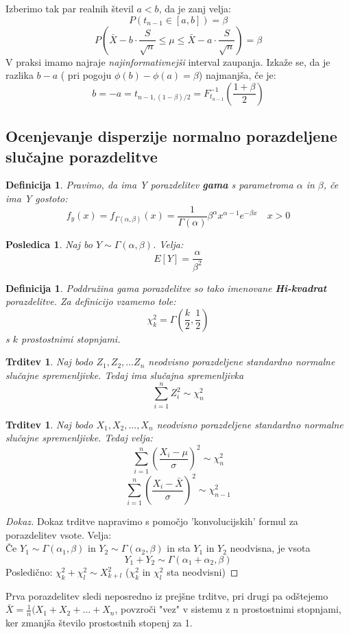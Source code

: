 \documentclass[11pt]{article}
\newtheorem{Trditev}[Izrek]{{\sc Trditev}}
\newtheorem{Posledica}[Izrek]{{\sc Posledica}}
\newtheorem{Definicija}[Izrek]{{\sc Definicija}}
\newenvironment{dokaz}[1][{\sc Dokaz}]{\begin{proof}[#1]\renewcommand*{\qedsymbol}{\(\blacksquare\)}}{\end{proof}}
\begin{document}
Izberimo tak par realnih števil $a<b$, da je zanj velja:
$$P(t_{n-1}\in [a,b]) = \beta$$
$$P(\bar{X}-b \cdot \frac{S}{\sqrt{n}} \le \mu \le \bar{X} -a \cdot \frac{S}{\sqrt{n}}) = \beta$$
V praksi imamo najraje \textit{najinformativnejši} interval zaupanja. Izkaže se, da je razlika $b-a$ ( pri pogoju $\phi(b) - \phi(a) = \beta$) najmanjša, če je:
$$b = -a = t_{n-1,(1-\beta)/2} = F^{-1}_{t_{n-1}}\left(\frac{1+\beta}{2}\right)$$
\subsection{Ocenjevanje disperzije normalno porazdeljene slučajne porazdelitve}

\begin{Definicija}
	Pravimo, da ima Y porazdelitev \textbf{gama} s parametroma $\alpha$ in $\beta$, če ima Y gostoto:
	$$f_y(x) = f_{\Gamma(\alpha,\beta)} (x) = \frac{1}{\Gamma(\alpha)}\beta^{\alpha}x^{\alpha - 1} e^{-\beta x} \quad x>0$$
\end{Definicija}
\begin{Posledica}
	Naj bo $Y\sim \Gamma(\alpha,\beta)$. Velja:
	$$E[Y] = \frac{\alpha}{\beta^2}$$
\end{Posledica}

\begin{Definicija}
	Poddružina gama porazdelitve so tako imenovane \textbf{Hi-kvadrat} porazdelitve. Za definicijo vzamemo tole:
	$$\chi_k^{2} = \Gamma(\frac{k}{2},\frac{1}{2})$$ s $k$ prostostnimi stopnjami.
\end{Definicija}
\begin{Trditev}
	Naj bodo $Z_1, Z_2,\ldots Z_n$ neodvisno porazdeljene standardno normalne slučajne spremenljivke. Tedaj ima slučajna spremenljivka 
	$$\sum_{i = 1}^{n}{Z_i^2} \sim \chi^2_n$$
\end{Trditev}
\begin{Trditev}
	Naj bodo $X_1, X_2, \ldots , X_n$ neodvisno porazdeljene standardno normalne slučajne spremenljivke. Tedaj velja:
	$$\sum_{i =1}^{n}\left(\frac{X_i- \mu}{\sigma}\right)^2\sim \chi^2_n$$
	$$\sum_{i =1}^{n}\left(\frac{X_i- \bar{X}}{\sigma}\right)^2\sim \chi^2_{n-1}$$
\end{Trditev}
\begin{dokaz}
	Dokaz trditve napravimo s pomočjo 'konvolucijskih' formul za porazdelitev vsote.
	Velja:
	\\
	Če $Y_1 \sim \Gamma(\alpha_1,\beta)$ in $Y_2 \sim \Gamma(\alpha_2,\beta)$ in sta $Y_1$ in $Y_2$ neodvisna, je vsota 
	$$Y_1 + Y_2 \sim \Gamma(\alpha_1+\alpha_2,\beta)$$
	Posledično: $\chi_k^2 + \chi_l^2 \sim X_{k+l}^2$ ($\chi_k^2$ in $\chi_l^2$ sta neodvisni)
\end{dokaz}
Prva porazdelitev sledi neposredno iz prejšne trditve, pri drugi pa odštejemo $\bar{X} = \frac{1}{n}{(X_1 + X_2 + \ldots + X_n}$, povzroči "vez" v sistemu z n prostostnimi stopnjami, ker zmanjša število prostostnih stopenj za 1.
\end{document}
